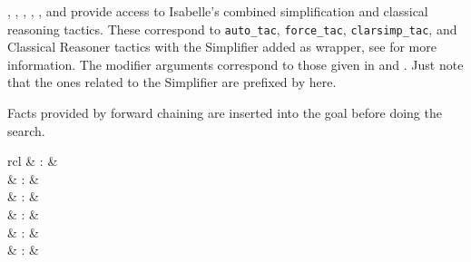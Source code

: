 \begin{isabellebody}
\begin{isamarkuptext}
\begin{description}
  \item \hyperlink{method.auto}{\mbox{}}, \hyperlink{method.force}{\mbox{}}, \hyperlink{method.clarsimp}{\mbox{}}, \hyperlink{method.fastsimp}{\mbox{}}, \hyperlink{method.slowsimp}{\mbox{}}, and \hyperlink{method.bestsimp}{\mbox{}} provide access
  to Isabelle's combined simplification and classical reasoning
  tactics.  These correspond to \verb|auto_tac|, \verb|force_tac|, \verb|clarsimp_tac|, and Classical Reasoner tactics with the Simplifier
  added as wrapper, see \cite{isabelle-ref} for more information.  The
  modifier arguments correspond to those given in
   and .  Just note that
  the ones related to the Simplifier are prefixed by 
  here.

  Facts provided by forward chaining are inserted into the goal before
  doing the search.

  \end{description}%
\end{isamarkuptext}%
\isamarkuptrue%
%
\isamarkuptrue%
%
\begin{isamarkuptext}%
\begin{matharray}{rcl}
    \hypertarget{command.print-claset}{\hyperlink{command.print-claset}{\mbox{}}} & : &  \\
    \hypertarget{attribute.intro}{\hyperlink{attribute.intro}{\mbox{}}} & : &  \\
    \hypertarget{attribute.elim}{\hyperlink{attribute.elim}{\mbox{}}} & : &  \\
    \hypertarget{attribute.dest}{\hyperlink{attribute.dest}{\mbox{}}} & : &  \\
    \hypertarget{attribute.rule}{\hyperlink{attribute.rule}{\mbox{}}} & : &  \\
    \hypertarget{attribute.iff}{\hyperlink{attribute.iff}{\mbox{}}} & : &  \\
  \end{matharray}


\end{isamarkuptext}
\end{isabellebody}
